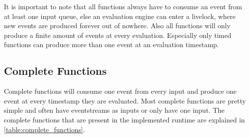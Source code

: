 It is important to note that all functions always have to consume an event from at least one input queue, else an evaluation engine can enter a livelock, where new events are produced forever out of nowhere.
Also all functions will only produce a finite amount of events at every evaluation.
Especially only timed functions can produce more than one event at an evaluation timestamp.

\subsection{Complete Functions}
\label{sec:definitions:tessla_functions:complete}

Complete functions will consume one event from every input and produce one event at every timestamp they are evaluated.
Most complete functions are pretty simple and often have eventstreams as inputs or only have one input.
The complete functions that are present in the implemented runtime are explained in \cref{table:complete_functions}.

